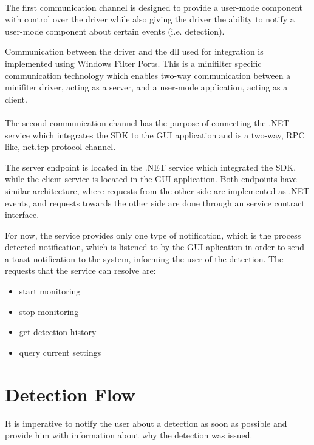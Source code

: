         \paragraph{}
        The first communication channel is designed to provide a user-mode component with control over the driver while also giving the driver
        the ability to notify a user-mode component about certain events (i.e. detection).
        
        Communication between the driver and the dll used for integration is implemented using Windows Filter Ports. This is a minifilter
        specific communication technology which enables two-way communication between a minifiter driver, acting as a server, and a user-mode
        application, acting as a client.

        \paragraph{}
        The second communication channel has the purpose of connecting the .NET service which integrates the SDK to the GUI application and is
        a two-way, RPC like, net.tcp protocol channel.

        The server endpoint is located in the .NET service which integrated the SDK, while the client service is located in the GUI application.
        Both endpoints have similar architecture, where requests from the other side are implemented as .NET events, and requests towards the other
        side are done through an service contract interface.

        For now, the service provides only one type of notification, which is the process detected notification, which is listened to by the GUI
        aplication in order to send a toast notification to the system, informing the user of the detection.
        The requests that the service can resolve are:
        \begin{itemize}
            \item start monitoring
            \item stop monitoring
            \item get detection history
            \item query current settings
        \end{itemize}

    \section{Detection Flow}
        It is imperative to notify the user about a detection as soon as possible and provide him with information about why the detection
        was issued. 

